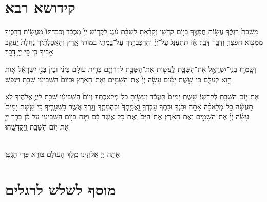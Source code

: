 \documentclass[twoside, openany, parskip=half, 11pt]{book}
\begin{document}
%

\mournerskaddish
\adonolam

\chapter[קידושא רבא לשבת]{ קידושא רבא }

מִשַּׁבָּת֙ רַגְלֶ֔ךָ עֲשׂ֥וֹת חֲפָצֶ֖ךָ בְּי֣וֹם קׇדְשִׁ֑י וְקָרָ֨אתָ לַשַּׁבָּ֜ת עֹ֗נֶג לִקְד֤וֹשׁ יְיָ֙ מְכֻבָּ֔ד וְכִבַּדְתּוֹ֙ מֵעֲשׂ֣וֹת דְּרָכֶ֔יךָ מִמְּצ֥וֹא חֶפְצְךָ֖ וְדַבֵּ֥ר דָּבָֽר׃ אָ֗ז תִּתְעַנַּג֙ עַל־יְיָ֔ וְהִרְכַּבְתִּ֖יךָ עַל־בָּ֣מֳתֵי במותי אָ֑רֶץ וְהַאֲכַלְתִּ֗יךָ נַחֲלַת֙ יַֽעֲקֹ֣ב אָבִ֔יךָ כִּ֛י פִּ֥י יְיָ֖ דִּבֵּֽר׃

וְשָֽׁמְר֥וּ בְנֵֽי־יִשְׂרָאֵ֖ל אֶת־הַשַּׁבָּ֑ת לַֽעֲשׂ֧וֹת אֶת־הַשַּׁבָּ֛ת לְדֹֽרֹתָ֖ם בְּרִ֥ית עוֹלָֽם׃ בֵּינִ֗י וּבֵין֙ בְּנֵ֣י יִשְׂרָאֵ֔ל א֥וֹת הִ֖וא לְעֹלָ֑ם כִּי־שֵׁ֣שֶׁת יָמִ֗ים עָשָׂ֤ה יְיָ֙ אֶת־הַשָּׁמַ֣יִם וְאֶת־הָאָ֔רֶץ וּבַיּוֹם֙ הַשְּׁבִיעִ֔י שָׁבַ֖ת וַיִּנָּפַֽשׁ׃


אֶת־י֥וֹם הַשַּׁבָּ֖ת לְקַדְּשֽׁוֹ׃ שֵׁ֤שֶׁת יָמִים֙ תַּֽעֲבֹ֔ד וְעָשִׂ֖יתָ כׇּל־מְלַאכְתֶּֽךָ׃ וְיוֹם֙ הַשְּׁבִיעִ֔י שַׁבָּ֖ת לַיֽיֳ֣ אֱלֹהֶיךָ לֹא תַֽעֲשֶׂ֨ה כׇל־מְלָאכָ֜ה אַתָּ֣ה וּבִנְךָ֣ וּבִתֶֽךָ עַבְדְּךָ֤ וַֽאֲמָֽתְךָ֙ וּבְהֶמְתֶֽךָ וְגֵֽרְךָ֖ אֲשֶׁ֥ר בִּשְׁעָרֶֽיךָ׃ כִּ֣י שֵֽׁשֶׁת יָמִים֩ עָשָׂ֨ה יְיָ֜ אֶת־הַשָּׁמַ֣יִם וְאֶת־הָאָ֗רֶץ אֶת־הַיָּם֙ וְאֶת־כׇּל־אֲשֶׁר בָּ֔ם וַיָּ֖נַח בַּיּ֣וֹם הַשְּׁבִיעִי עַל כֵּ֗ן בֵּרַ֧ךְ יְיָ֛ אֶת־י֥וֹם הַשַּׁבָּ֖ת וַֽיְקַדְּשֵֽׁהוּ׃

\\
אַתָּה יְיָ אֱלֹהֵֽינוּ מֶֽלֶךְ הָעוֹלָם בּוֹרֵא פְּרִי הַגָֽפֶן׃

\chapter[מוסף לשלש רגלים]{ מוסף לשלש לרגלים ‎}
\label{musaphregel}



\specialsaavos

\specialsameisim
\nextpage
{}
\\
\end{document}
